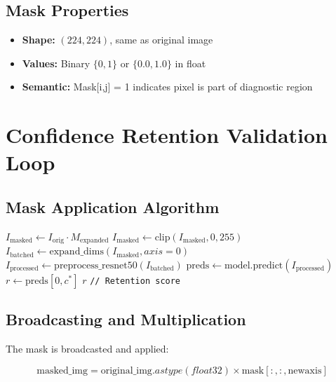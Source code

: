 \documentclass[12pt,a4paper,oneside]{book}
\begin{document}
\subsection{Mask Properties}

\begin{itemize}
  \item \textbf{Shape:} $(224, 224)$, same as original image
  \item \textbf{Values:} Binary $\{0, 1\}$ or $\{0.0, 1.0\}$ in float
  \item \textbf{Semantic:} Mask[i,j] = 1 indicates pixel is part of diagnostic region
\end{itemize}

\section{Confidence Retention Validation Loop}

\subsection{Mask Application Algorithm}

\begin{algorithm}[H]
\caption{Mask Application and Re-prediction}
\begin{algorithmic}[1]
  \State $I_{\text{masked}} \gets I_{\text{orig}} \cdot M_{\text{expanded}}$
  \State $I_{\text{masked}} \gets \text{clip}(I_{\text{masked}}, 0, 255)$
  \State
  \State $I_{\text{batched}} \gets \text{expand\_dims}(I_{\text{masked}}, axis=0)$
  \State $I_{\text{processed}} \gets \text{preprocess\_resnet50}(I_{\text{batched}})$
  \State
  \State $\text{preds} \gets \text{model.predict}(I_{\text{processed}})$
  \State $r \gets \text{preds}[0, c^*]$
  \State
  \Return $r$ \texttt{// Retention score}
\EndProcedure
\end{algorithmic}
\end{algorithm}

\subsection{Broadcasting and Multiplication}

The mask is broadcasted and applied:

\begin{equation}
\text{masked\_img} = \text{original\_img}.astype(float32) \times \text{mask}[:,:,\text{newaxis}]
\end{equation}
\end{document}
